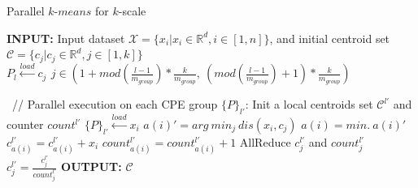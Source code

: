 \begin{algorithm}
\caption{Parallel $k$-$means$ for $k$-scale}
\label{alg:2}
\begin{algorithmic}[1]%
\STATE \textbf{INPUT:} Input dataset $\mathcal{X} = \{x_i | x_i\in\mathds{R}^d, i\in[1, n]\}$, and initial centroid set $\mathcal{C} = \{c_j | c_j\in\mathds{R}^d, j\in[1,k]\}$
\STATE $P_{l}\xleftarrow{load}{c_j}\,\ j \in (1+mod(\frac{l-1}{m_{group}})*\frac{k}{m_{group}},\ (mod(\frac{l-1}{m_{group}})+1)*\frac{k}{m_{group}})$
\REPEAT

\STATE \ // Parallel execution on each CPE group $\{P\}_{l'}$:
\STATE Init a local centroids set $\mathcal{C}^{l'}$ and counter $count^{l'}$
\STATE $\{P\}_{l'} \xleftarrow{load} x_i$ %
\STATE $a(i)' = arg\ min_j\ dis(x_i, c_j)$
\STATE $a(i)  = min.\ a(i)'$
\STATE $c_{a(i)}^{l'} = c_{a(i)}^{l'} + x_i$
\STATE $count_{a(i)}^{l'} =count_{a(i)}^{l'}+1$
\ENDFOR
\STATE AllReduce $c_j^{l'}$ and $count_j^{l'}$
\STATE $c_j^{l'} =  \frac{c_j^{l'}}{count_j^{l'}}$
\ENDFOR
\ENDFOR
{}
\STATE \textbf{OUTPUT:} $\mathcal{C}$
\end{algorithmic}
\end{algorithm}

